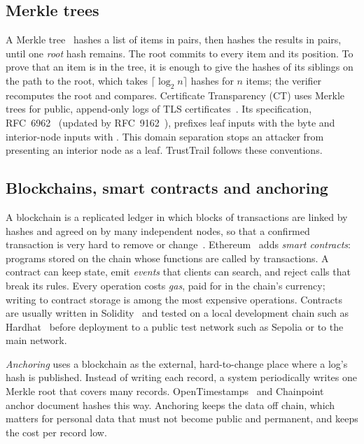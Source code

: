 \subsection{Merkle trees}
A Merkle tree~\cite{merkle1987signature} hashes a list of items in pairs, then hashes the results in pairs, until one \emph{root} hash remains. The root commits to every item and its position. To prove that an item is in the tree, it is enough to give the hashes of its siblings on the path to the root, which takes $\lceil \log_2 n \rceil$ hashes for $n$ items; the verifier recomputes the root and compares. Certificate Transparency (CT) uses Merkle trees for public, append-only logs of TLS certificates~\cite{laurie2014certificate}. Its specification, RFC~6962~\cite{rfc6962} (updated by RFC~9162~\cite{rfc9162}), prefixes leaf inputs with the byte  and interior-node inputs with . This domain separation stops an attacker from presenting an interior node as a leaf. TrustTrail follows these conventions.

\subsection{Blockchains, smart contracts and anchoring}
A blockchain is a replicated ledger in which blocks of transactions are linked by hashes and agreed on by many independent nodes, so that a confirmed transaction is very hard to remove or change~\cite{nakamoto2008bitcoin}. Ethereum~\cite{wood2014ethereum} adds \emph{smart contracts}: programs stored on the chain whose functions are called by transactions. A contract can keep state, emit \emph{events} that clients can search, and reject calls that break its rules. Every operation costs \emph{gas}, paid for in the chain's currency; writing to contract storage is among the most expensive operations. Contracts are usually written in Solidity~\cite{soliditydocs} and tested on a local development chain such as Hardhat~\cite{hardhatdocs} before deployment to a public test network such as Sepolia or to the main network.

\emph{Anchoring} uses a blockchain as the external, hard-to-change place where a log's hash is published. Instead of writing each record, a system periodically writes one Merkle root that covers many records. OpenTimestamps~\cite{todd2016opentimestamps} and Chainpoint~\cite{chainpoint} anchor document hashes this way. Anchoring keeps the data off chain, which matters for personal data that must not become public and permanent, and keeps the cost per record low.

